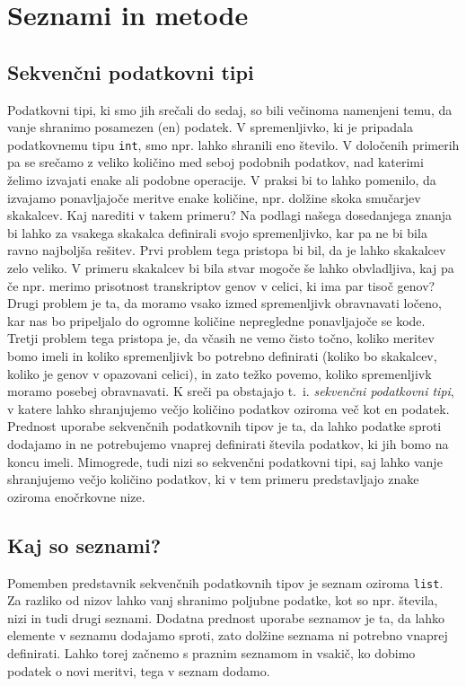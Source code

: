 \chapter{Seznami in metode}

\section{Sekvenčni podatkovni tipi}

Podatkovni tipi, ki smo jih srečali do sedaj, so bili večinoma namenjeni temu, da vanje shranimo posamezen (en) podatek. V spremenljivko, ki je pripadala podatkovnemu tipu \texttt{int}, smo npr. lahko shranili eno število. V določenih primerih pa se srečamo z veliko količino med seboj podobnih podatkov, nad katerimi želimo izvajati enake ali podobne operacije. V praksi bi to lahko pomenilo, da izvajamo ponavljajoče meritve enake količine, npr. dolžine skoka smučarjev skakalcev. Kaj narediti v takem primeru? Na podlagi našega dosedanjega znanja bi lahko za vsakega skakalca definirali svojo spremenljivko, kar pa ne bi bila ravno najboljša rešitev. Prvi problem tega pristopa bi bil, da je lahko skakalcev zelo veliko. V primeru skakalcev bi bila stvar mogoče še lahko obvladljiva, kaj pa če npr. merimo prisotnost transkriptov genov v celici, ki ima par tisoč genov? Drugi problem je ta, da moramo vsako izmed spremenljivk obravnavati ločeno, kar nas bo pripeljalo do ogromne količine nepregledne ponavljajoče se kode. Tretji problem tega pristopa je, da včasih ne vemo čisto točno, koliko meritev bomo imeli in koliko spremenljivk bo potrebno definirati (koliko bo skakalcev, koliko je genov v opazovani celici), in zato težko povemo, koliko spremenljivk moramo posebej obravnavati. K sreči pa obstajajo t.~i. \emph{sekvenčni podatkovni tipi}, v katere lahko shranjujemo večjo količino podatkov oziroma več kot en podatek. Prednost uporabe sekvenčnih podatkovnih tipov je ta, da lahko podatke sproti dodajamo in ne potrebujemo vnaprej definirati števila podatkov, ki jih bomo na koncu imeli. Mimogrede, tudi nizi so sekvenčni podatkovni tipi, saj lahko vanje shranjujemo večjo količino podatkov, ki v tem primeru predstavljajo znake oziroma enočrkovne nize. 

\section{Kaj so seznami?}

Pomemben predstavnik sekvenčnih podatkovnih tipov je seznam oziroma \texttt{list}. Za razliko od nizov lahko vanj shranimo poljubne podatke, kot so npr. števila, nizi in tudi drugi seznami. Dodatna prednost uporabe seznamov je ta, da lahko elemente v seznamu dodajamo sproti, zato dolžine seznama ni potrebno vnaprej definirati. Lahko torej začnemo s praznim seznamom in vsakič, ko dobimo podatek o novi meritvi, tega v seznam dodamo. 

